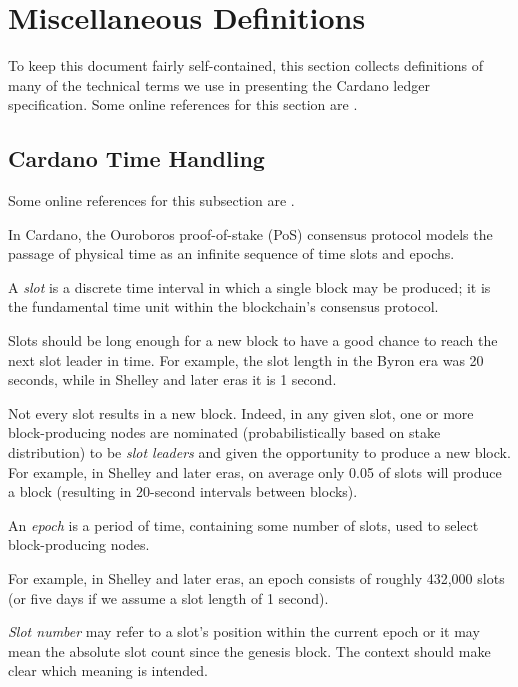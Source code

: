 \section{Miscellaneous Definitions}
\label{sec:misc-defs}
To keep this document fairly self-contained, this section collects definitions of
many of the technical terms we use in presenting the Cardano ledger specification.
Some online references for this section are
\cite{www-essential-cardano-glossary,www-developers-cardano-reintro,www-ledger-academy-glossary}.


\subsection{Cardano Time Handling}
\label{sec:cardano-time-handling}
Some online references for this subsection are
\cite{www-docs-cardano-network,www-docs-cardano-time,www-iohk-blog-ouroboros,www-ledger-academy-stake-ada}.

In Cardano, the Ouroboros proof-of-stake (PoS) consensus protocol models the passage
of physical time as an infinite sequence of time slots and epochs.

\begin{definition}[slot]
  A \emph{slot} is a discrete time interval in which a single block may be produced; it
  is the fundamental time unit within the blockchain's consensus protocol.
\end{definition}
Slots should be long enough for a new block to have a good chance to reach
the next slot leader in time.  For example, the slot length in the Byron era was 20
seconds, while in Shelley and later eras it is 1 second.

Not every slot results in a new block.  Indeed, in any given slot, one or more
block-producing nodes are nominated (probabilistically based on stake distribution)
to be \textit{slot leaders} and given the opportunity to produce a new block.
For example, in Shelley and later eras, on average only 0.05 of slots will produce a
block (resulting in 20-second intervals between blocks).

\begin{definition}[epoch]
  An \emph{epoch} is a period of time, containing some number of slots, used to select
  block-producing nodes.
\end{definition}
For example, in Shelley and later eras, an epoch consists of roughly 432,000 slots (or five
days if we assume a slot length of 1 second).

\begin{definition}
  \emph{Slot number} may refer to a slot's position within the current epoch or it
  may mean the absolute slot count since the genesis block.  The context should make
  clear which meaning is intended.
\end{definition}

